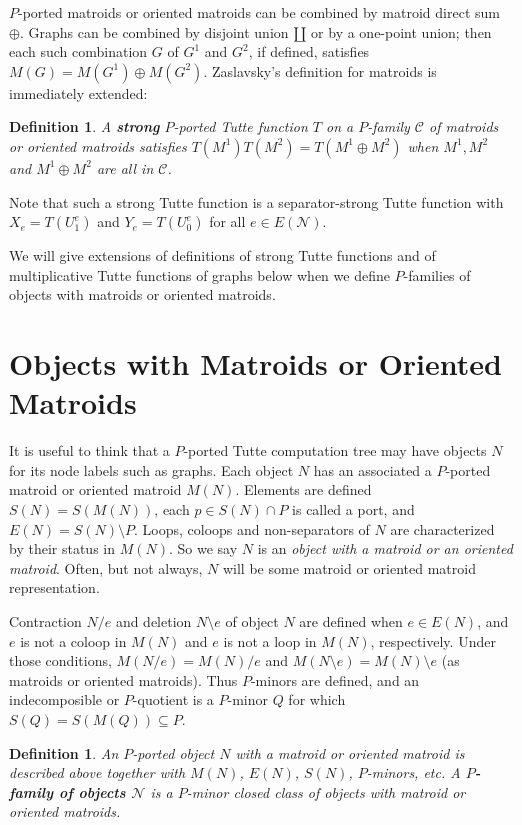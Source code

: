 \documentclass[12pt,leqno]{amsart}
\newtheorem{definition}[lem]{Definition}
\theoremstyle{remark}
\begin{document}
$P$-ported matroids or oriented matroids can be combined 
by matroid direct sum $\oplus$.  Graphs can be combined
by disjoint union $\amalg$ or by a one-point union;
then each such combination $G$ of $G^1$ and $G^2$, if defined,
satisfies $M(G)=M(G^1)\oplus M(G^2)$.  
Zaslavsky's definition\cite{MR93a:05047} for 
matroids is immediately extended:


\begin{definition}
A \textbf{strong} $P$-ported Tutte function $T$ on a $P$-family 
$\mathcal{C}$ of matroids
or oriented matroids satisfies $T(M^1)T(M^2)=T(M^1\oplus M^2)$
when $M^1, M^2$ and $M^1\oplus M^2$ are all in $\mathcal{C}$.
\end{definition}

Note that such a strong Tutte function is a separator-strong
Tutte function with $X_e=T(U^e_1)$ and
$Y_e=T(U^e_0)$ for all $e\in E(\mathcal{N})$.

We will give extensions of definitions of strong Tutte functions
and of multiplicative Tutte functions of graphs below when
we define $P$-families of objects with matroids or oriented 
matroids.



\section{Objects with Matroids or Oriented Matroids}

It is useful to think that a $P$-ported Tutte computation tree may have
objects $N$ for its node labels such as graphs.
Each object $N$ has an associated
a $P$-ported matroid or oriented matroid $M(N)$.
Elements are defined $S(N)=S(M(N))$, 
each $p\in S(N)\cap P$ is called a port, and
$E(N)=S(N)\setminus P$.  Loops, coloops and non-separators of $N$
are characterized by their status in $M(N)$.  So we
say $N$ is an \emph{object with a matroid or an oriented matroid}.
Often, but not always, $N$ will be some matroid or oriented
matroid representation.


Contraction $N/e$ and deletion $N\setminus e$ 
of object $N$ are defined when $e\in E(N)$, and
$e$ is not a coloop in $M(N)$ and 
$e$ is not a loop in $M(N)$, respectively.
Under those conditions, $M(N/e)=M(N)/e$ and 
$M(N\setminus e)=M(N)\setminus e$ (as matroids or
oriented matroids).
Thus $P$-minors are defined,
and an indecomposible or $P$-quotient
is a $P$-minor $Q$ for which $S(Q)=S(M(Q))\subseteq P$.

\begin{definition}
\label{OMOMdef}
An $P$-ported object $N$ with a matroid or oriented matroid 
is described above together with $M(N)$, $E(N)$, $S(N)$,
$P$-minors, etc.
A \textbf{$P$-family of objects $\mathcal{N}$}
is a $P$-minor closed class of 
objects with matroid or oriented matroids.
\end{definition}
\end{document}
